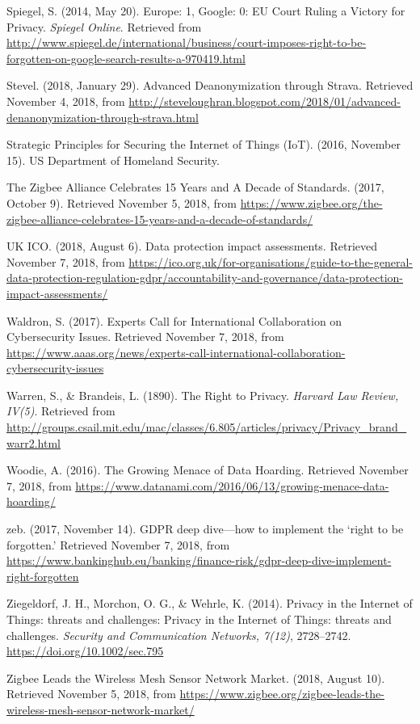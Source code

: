 \begin{hangparas}{2em}{1}
Spiegel, S. (2014, May 20). Europe: 1, Google: 0: EU Court Ruling a Victory for Privacy. \textit{Spiegel Online}. Retrieved from \url{http://www.spiegel.de/international/business/court-imposes-right-to-be-forgotten-on-google-search-results-a-970419.html}

Stevel. (2018, January 29). Advanced Deanonymization through Strava. Retrieved November 4, 2018, from \url{http://steveloughran.blogspot.com/2018/01/advanced-denanonymization-through-strava.html}

Strategic Principles for Securing the Internet of Things (IoT). (2016, November 15). US Department of Homeland Security.

The Zigbee Alliance Celebrates 15 Years and A Decade of Standards. (2017, October 9). Retrieved November 5, 2018, from \url{https://www.zigbee.org/the-zigbee-alliance-celebrates-15-years-and-a-decade-of-standards/}

UK ICO. (2018, August 6). Data protection impact assessments. Retrieved November 7, 2018, from \url{https://ico.org.uk/for-organisations/guide-to-the-general-data-protection-regulation-gdpr/accountability-and-governance/data-protection-impact-assessments/}

Waldron, S. (2017). Experts Call for International Collaboration on Cybersecurity Issues. Retrieved November 7, 2018, from \url{https://www.aaas.org/news/experts-call-international-collaboration-cybersecurity-issues}

Warren, S., \& Brandeis, L. (1890). The Right to Privacy. \textit{Harvard Law Review, IV(5)}. Retrieved from \url{http://groups.csail.mit.edu/mac/classes/6.805/articles/privacy/Privacy_brand_warr2.html}

Woodie, A. (2016). The Growing Menace of Data Hoarding. Retrieved November 7, 2018, from \url{https://www.datanami.com/2016/06/13/growing-menace-data-hoarding/}

zeb. (2017, November 14). GDPR deep dive—how to implement the ‘right to be forgotten.’ Retrieved November 7, 2018, from \url{https://www.bankinghub.eu/banking/finance-risk/gdpr-deep-dive-implement-right-forgotten}

Ziegeldorf, J. H., Morchon, O. G., \& Wehrle, K. (2014). Privacy in the Internet of Things: threats and challenges: Privacy in the Internet of Things: threats and challenges. \textit{Security and Communication Networks, 7(12)}, 2728–2742. \url{https://doi.org/10.1002/sec.795}

Zigbee Leads the Wireless Mesh Sensor Network Market. (2018, August 10). Retrieved November 5, 2018, from \url{https://www.zigbee.org/zigbee-leads-the-wireless-mesh-sensor-network-market/}
\end{hangparas}
